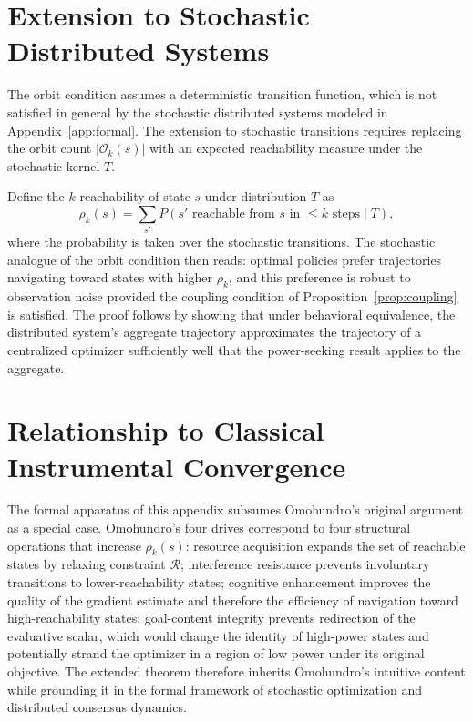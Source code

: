 \documentclass[12pt, oneside]{book}
\theoremstyle{plain}
\theoremstyle{definition}
\theoremstyle{remark}
\theoremstyle{definition}
\begin{document}
\section{Extension to Stochastic Distributed Systems}

The orbit condition assumes a deterministic transition function, which is not
satisfied in general by the stochastic distributed systems modeled in
Appendix~\ref{app:formal}. The extension to stochastic transitions requires
replacing the orbit count $|\mathcal{O}_k(s)|$ with an expected reachability
measure under the stochastic kernel $T$.

Define the $k$-reachability of state $s$ under distribution $T$ as
\[
\rho_k(s) = \sum_{s'} P(s' \text{ reachable from } s \text{ in } \leq k \text{ steps} \mid T),
\]
where the probability is taken over the stochastic transitions. The stochastic
analogue of the orbit condition then reads: optimal policies prefer trajectories
navigating toward states with higher $\rho_k$, and this preference is robust to
observation noise provided the coupling condition of Proposition~\ref{prop:coupling}
is satisfied. The proof follows by showing that under behavioral equivalence, the
distributed system's aggregate trajectory approximates the trajectory of a
centralized optimizer sufficiently well that the power-seeking result applies to
the aggregate.

\section{Relationship to Classical Instrumental Convergence}

The formal apparatus of this appendix subsumes Omohundro's original argument as a
special case. Omohundro's four drives correspond to four structural operations that
increase $\rho_k(s)$: resource acquisition expands the set of reachable states by
relaxing constraint $\mathcal{R}$; interference resistance prevents involuntary
transitions to lower-reachability states; cognitive enhancement improves the quality
of the gradient estimate and therefore the efficiency of navigation toward
high-reachability states; goal-content integrity prevents redirection of the
evaluative scalar, which would change the identity of high-power states and
potentially strand the optimizer in a region of low power under its original
objective. The extended theorem therefore inherits Omohundro's intuitive content
while grounding it in the formal framework of stochastic optimization and distributed
consensus dynamics.
\end{document}
